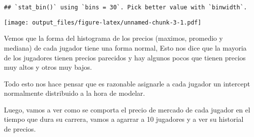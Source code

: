 \documentclass[
]{article}
\begin{document}
\begin{verbatim}
## `stat_bin()` using `bins = 30`. Pick better value with `binwidth`.
\end{verbatim}

\texttt{[image: output\_files/figure-latex/unnamed-chunk-3-1.pdf]}

Vemos que la forma del histograma de los precios (maximos, promedio y
mediana) de cada jugador tiene una forma normal, Esto nos dice que la
mayoria de los jugadores tienen precios parecidos y hay algunos pocos
que tienen precios muy altos y otros muy bajos.

Todo esto nos hace pensar que es razonable asignarle a cada jugador un
intercept normalmente distribuido a la hora de modelar.

Luego, vamos a ver como se comporta el precio de mercado de cada jugador
en el tiempo que dura su carrera, vamos a agarrar a 10 jugadores y a ver
su historial de precios.
\end{document}
